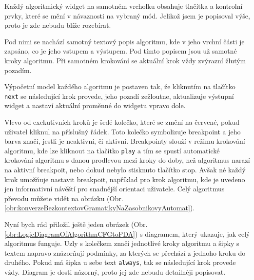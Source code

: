 

Každý algoritmický widget na samotném vrcholku obsahuje tlačítka a kontrolní prvky, které se mění v návaznosti na vybraný mód. Jelikož jsem je popisoval výše, proto je zde nebudu blíže rozebírat.

Pod nimi se nachází samotný textový popis algoritmu, kde v jeho vrchní části je zapsáno, co je jeho vstupem a výstupem. Pod tímto popisem jsou už samotné kroky algoritmu. Při samotném krokování se aktuální krok vždy zvýrazní žlutým pozadím. 

Výpočetní model každého algoritmu je postaven tak, že kliknutím na tlačítko \texttt{next} se následující krok provede, jeho pozadí zežloutne, aktualizuje výstupní widget a nastaví aktuální proměnné do widgetu vpravo dole. 

Vlevo od exekutivních kroků je šedé kolečko, které se změní na červené, pokud uživatel kliknul na příslušný řádek. Toto kolečko symbolizuje breakpoint a jeho barva značí, jestli je neaktivní, či aktivní. Breakpointy slouží v režimu krokování algoritmu, kde lze kliknout na tlačítko \texttt{play} a tím se spustí automatické krokování algoritmu s danou prodlevou mezi kroky do doby, než algoritmus narazí na aktivní breakpoit, nebo dokud nebylo stisknuto tlačítko stop. Avšak né každý krok umožňuje nastavit breakpoit, například pro krok algoritmu, kde je uvedeno jen informativní návěští pro snadnější orientaci uživatele. Celý algoritmus převodu můžete vidět na obrázku (Obr. \ref{obr:konverzeBezkontextovGramatikyNaZasobnikovyAutomat}).

Nyní bych rád přiložil ještě jeden obrázek (Obr. \ref{obr:LogicDiagramOfAlgorithmCFGtoPDA}) s diagramem, který ukazuje, jak celý algoritmus funguje. Uzly s kolečkem značí jednotlivé kroky algoritmu a šipky s textem napravo znázorňují podmínky, za kterých se přechází z jednoho kroku do druhého. Pokud má šipka u sebe text \texttt{always}, tak se následující krok provede vždy. Diagram je dosti názorný, proto jej zde nebudu detailněji popisovat.



